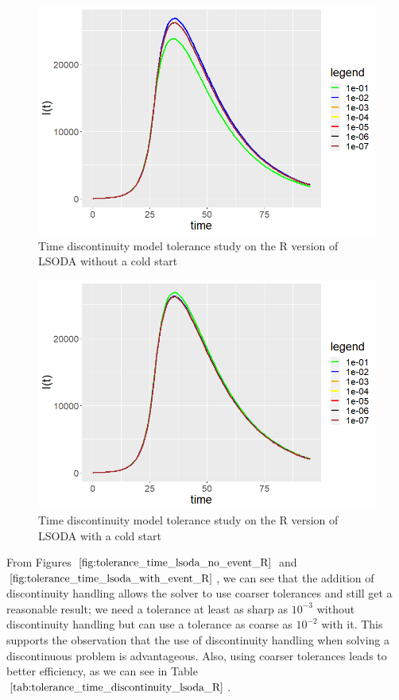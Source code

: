 \begin{figure}[H]
\centering
\includegraphics[width=0.7\linewidth]{./figures/tolerance_time_lsoda_no_event_R}
\caption{Time discontinuity model tolerance study on the R version of LSODA without a cold start}
\label{fig:tolerance_time_lsoda_no_event_R}
\end{figure}

\begin{figure}[H]
\centering
\includegraphics[width=0.7\linewidth]{./figures/tolerance_time_lsoda_with_event_R}
\caption{Time discontinuity model tolerance study on the R version of LSODA with a cold start}
\label{fig:tolerance_time_lsoda_with_event_R}
\end{figure}

From Figures $\ref{fig:tolerance_time_lsoda_no_event_R}$ and $\ref{fig:tolerance_time_lsoda_with_event_R}$, we can see that the addition of discontinuity handling allows the solver to use coarser tolerances and still get a reasonable result; we need a tolerance at least as sharp as $10^{-3}$ without discontinuity handling but can use a tolerance as coarse as $10^{-2}$ with it. This supports the observation that the use of discontinuity handling when solving a discontinuous problem is advantageous. Also, using coarser tolerances leads to better efficiency, as we can see in Table $\ref{tab:tolerance_time_discontinuity_lsoda_R}$. 


